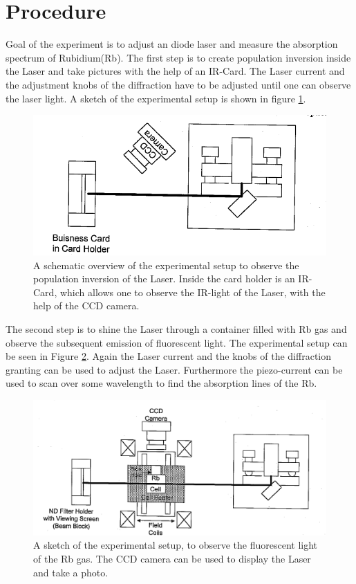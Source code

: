 \section{Procedure}
Goal of the experiment is to adjust an diode laser and measure the absorption spectrum of Rubidium(Rb). 
The first step is to create population inversion inside the Laser and take pictures with the help of an IR-Card.
The Laser current and the adjustment knobs of the diffraction have to be adjusted until one can observe the laser light.
A sketch of the experimental setup is shown in figure \ref{fig:exp1}.
\begin{figure}
    \centering
    \includegraphics[width = \linewidth]{Bilder/exp1.png}
    \caption{A schematic overview of the experimental setup to observe the population inversion of the Laser. Inside the card holder is an IR-Card, which allows one to observe the IR-light of the Laser, with the help of the CCD camera.\cite{sample}}
    \label{fig:exp1}
\end{figure}
The second step is to shine the Laser through a container filled with Rb gas and observe the subsequent emission of fluorescent light.  The experimental setup can be seen in Figure \ref{fig:exp2}. Again the Laser current and the knobs of the diffraction granting can be used to adjust the Laser. Furthermore the piezo-current can be used to scan over some wavelength to find the absorption lines of the Rb.
\begin{figure}
    \centering
    \includegraphics[width = \linewidth]{Bilder/exp2.png}
    \caption{A sketch of the experimental setup, to observe the fluorescent light of the Rb gas. The CCD camera can be used to display the Laser and take a photo. }
    \label{fig:exp2}
\end{figure}
